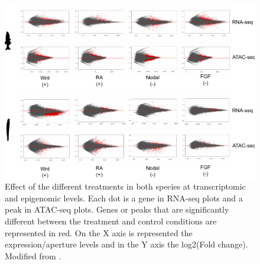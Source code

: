 \begin{figure}[hp]
\centering
\includegraphics[width=1\textwidth]{Figures/MA_plots}
\caption[MA plots]{ Effect of the different treatments in both species at transcriptomic and epigenomic levels. Each dot is a gene in RNA-seq plots and a peak in ATAC-seq plots. Genes or peaks that are significantly different between the treatment and control conditions are represented in red. On the X axis is represented the expression/aperture levels and in the Y axis the log2(Fold change). Modified from \parencite{gil-galvez_gain_2022}.
}
\label{fig:MA_plots}
\end{figure} 

